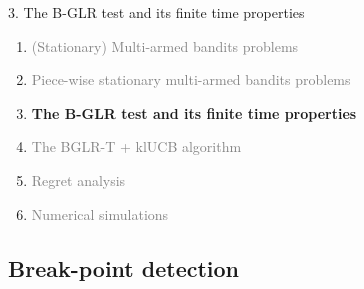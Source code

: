 \documentclass[11pt,english,ignorenonframetext,]{beamer}
\begin{document}
\begin{frame}{3. The B-GLR test and its finite time properties}

  \begin{enumerate}
    \item
    \textcolor{gray}{
      (Stationary) Multi-armed bandits problems
    }
    \vspace*{15pt}

    \item
    \textcolor{gray}{
      Piece-wise stationary multi-armed bandits problems
    }
    \vspace*{15pt}

    \item
    \alert{\textbf{%
      The B-GLR test and its finite time properties
    }}
    \vspace*{15pt}

    \item
    \textcolor{gray}{
      The BGLR-T + klUCB algorithm
    }
    \vspace*{15pt}

    \item
    \textcolor{gray}{
      Regret analysis
    }
    \vspace*{15pt}

    \item
    \textcolor{gray}{
      Numerical simulations
    }
  \end{enumerate}

\end{frame}


\subsection{\hfill{}Break-point detection\hfill{}}
\end{document}
